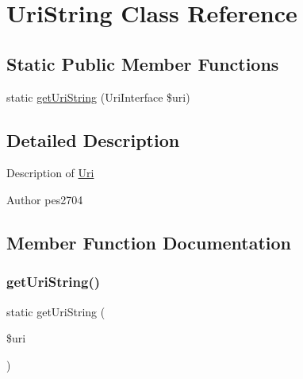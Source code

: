 \hypertarget{class_pes_1_1_http_1_1_uri_1_1_uri_string}{}\section{Uri\+String Class Reference}
\label{class_pes_1_1_http_1_1_uri_1_1_uri_string}
\subsection*{Static Public Member Functions}
\begin{DoxyCompactItemize}
\item 
static \mbox{\hyperlink{class_pes_1_1_http_1_1_uri_1_1_uri_string_ae249f5633002e5ed87c17efa34f61f04}{get\+Uri\+String}} (Uri\+Interface \$uri)
\end{DoxyCompactItemize}


\subsection{Detailed Description}
Description of \mbox{\hyperlink{class_pes_1_1_http_1_1_uri}{Uri}}

\begin{DoxyAuthor}{Author}
pes2704 
\end{DoxyAuthor}


\subsection{Member Function Documentation}
\mbox{\label{class_pes_1_1_http_1_1_uri_1_1_uri_string_ae249f5633002e5ed87c17efa34f61f04}} 
\subsubsection{\texorpdfstring{get\+Uri\+String()}{getUriString()}}
{\footnotesize\ttfamily static get\+Uri\+String (\begin{DoxyParamCaption}\item[{Uri\+Interface}]{\$uri }\end{DoxyParamCaption})\hspace{0.3cm}{\ttfamily [static]}}

